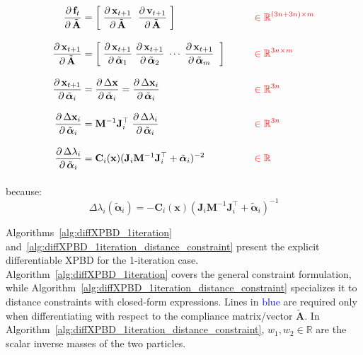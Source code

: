 \documentclass{article}
\newcommand{\pd}[2]{\dfrac{\partial\, #1}{\partial\, #2}}
\newcommand{\red}[1]{\textcolor{red}{#1}}
\newcommand{\blue}[1]{\textcolor{blue}{#1}}
\begin{document}
\begin{derivation}
\begin{equation*}
\begin{aligned}
\pd{\mathbf{f}_t}{\tilde{\mathbf{A}}} &= 
\bigg[\; 
\pd{\mathbf{x}_{t+1}}{\tilde{\mathbf{A}}}\;\;
\pd{\mathbf{v}_{t+1}}{\tilde{\mathbf{A}}}
\;\bigg] 
&&\qquad \red{\in \mathbb{R}^{(3n+3n)\times m}} \\[2ex]
\pd{\mathbf{x}_{t+1}}{\tilde{\mathbf{A}}} &= 
\bigg[\; 
\pd{\mathbf{x}_{t+1}}{\tilde{\boldsymbol{\alpha}}_1}\;
\pd{\mathbf{x}_{t+1}}{\tilde{\boldsymbol{\alpha}}_2}\;
\cdots\;
\pd{\mathbf{x}_{t+1}}{\tilde{\boldsymbol{\alpha}}_m}\;
\;\bigg]
&&\qquad \red{\in \mathbb{R}^{3n\times m}} \\[2ex]
\pd{\mathbf{x}_{t+1}}{\tilde{\boldsymbol{\alpha}}_i} &= 
\pd{\Delta \mathbf{x}}{\tilde{\boldsymbol{\alpha}}_i} =
\pd{\Delta \mathbf{x}_i}{\tilde{\boldsymbol{\alpha}}_i}
&&\qquad \red{\in \mathbb{R}^{3n}} \\[2ex]
\pd{\Delta \mathbf{x}_i}{\tilde{\boldsymbol{\alpha}}_i} &= 
\mathbf{M}^{-1}\mathbf{J}_i^\top\;\pd{\Delta \lambda_i}{\tilde{\boldsymbol{\alpha}}_i}
&&\qquad \red{\in \mathbb{R}^{3n}} \\[2ex]
\pd{\Delta \lambda_i}{\tilde{\boldsymbol{\alpha}}_i} &= 
\mathbf{C}_i(\mathbf{x})(\mathbf{J}_i\mathbf{M}^{-1}\mathbf{J}_i^\top + \tilde{\boldsymbol{\alpha}}_i)^{-2}
&&\qquad \red{\in \mathbb{R}} \\[2ex]
\end{aligned}
\end{equation*}
because:
\begin{equation*}
\Delta \lambda_i(\tilde{\boldsymbol{\alpha}}_i) = 
    - \mathbf{C}_i(\mathbf{x})(\mathbf{J}_i\mathbf{M}^{-1}\mathbf{J}_i^\top + \tilde{\boldsymbol{\alpha}}_i)^{-1}
\end{equation*}
\end{derivation}
Algorithms~\ref{alg:diffXPBD_1iteration} and~\ref{alg:diffXPBD_1iteration_distance_constraint} present the explicit differentiable XPBD for the 1-iteration case. Algorithm~\ref{alg:diffXPBD_1iteration} covers the general constraint formulation, while Algorithm~\ref{alg:diffXPBD_1iteration_distance_constraint} specializes it to distance constraints with closed-form expressions. Lines in \blue{blue} are required only when differentiating with respect to the compliance matrix/vector $\tilde{\mathbf{A}}$. In Algorithm~\ref{alg:diffXPBD_1iteration_distance_constraint}, $w_1, w_2 \in \mathbb{R}$ are the scalar inverse masses of the two particles.
\end{document}
